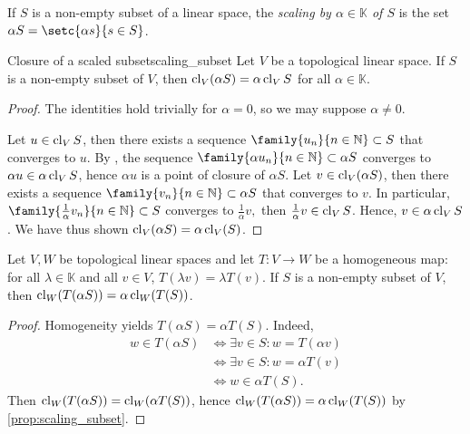 If \(S\) is a non-empty subset of a linear space, the \emph{scaling by \(\alpha\in \mathbb{K}\) of \(S\)} is the set \(\alpha S = \setc{\alpha s}{s \in S}\).
\begin{proposition}{Closure of a scaled subset}{scaling_subset}
    Let \(V\) be a topological linear space. If \(S\) is a non-empty subset of \(V\), then \(\operatorname{cl}_V(\alpha S) = \alpha \operatorname{cl}_VS\) for all \(\alpha \in \mathbb{K}\).
\end{proposition}
\begin{proof}
    The identities hold trivially for \(\alpha = 0\), so we may suppose \(\alpha \neq 0\).

    Let \(u \in \operatorname{cl}_VS\), then there exists a sequence \(\family{u_n}{n\in \mathbb{N}}\subset S\) that converges to \(u\). By , the sequence \(\family{\alpha u_n}{n\in \mathbb{N}} \subset \alpha S\) converges to \(\alpha u \in \alpha \operatorname{cl}_VS\), hence \(\alpha u\) is a point of closure of \(\alpha S\). Let \(v \in \operatorname{cl}_V(\alpha S)\), then there exists a sequence \(\family{v_n}{n\in \mathbb{N}} \subset \alpha S\) that converges to \(v\). In particular, \(\family{\frac{1}{\alpha}v_n}{n\in \mathbb{N}} \subset S\) converges to \(\frac{1}{\alpha}v,\) then \(\frac{1}{\alpha}v \in \operatorname{cl}_V S\). Hence, \(v \in \alpha \operatorname{cl}_V S\). We have thus shown \(\operatorname{cl}_V(\alpha S) = \alpha \operatorname{cl}_V(S)\).
\end{proof}
\begin{corollary}
    Let \(V,W\) be topological linear spaces and let \(T : V \to W\) be a homogeneous map: for all \(\lambda \in \mathbb{K}\) and all \(v \in V\), \(T(\lambda v) = \lambda T(v)\). If \(S\) is a non-empty subset of \(V\), then \(\operatorname{cl}_W(T(\alpha S)) = \alpha \operatorname{cl}_W(T(S))\).
\end{corollary}
\begin{proof}
    Homogeneity yields \(T(\alpha S) = \alpha T(S)\). Indeed,
    \begin{align*}
        w \in T(\alpha S) &\iff \exists v \in S : w = T(\alpha v)\\
                          &\iff \exists v \in S : w = \alpha T(v)\\
                          &\iff w \in \alpha T(S).
    \end{align*}
    Then \(\operatorname{cl}_W(T(\alpha S)) = \operatorname{cl}_W(\alpha T(S))\), hence \(\operatorname{cl}_W(T(\alpha S)) = \alpha \operatorname{cl}_W(T(S))\) by \cref{prop:scaling_subset}.
\end{proof}
